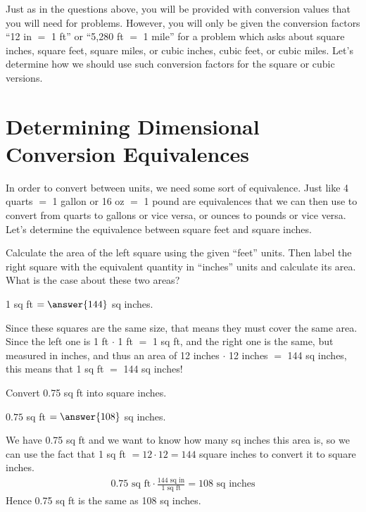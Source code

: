 \documentclass[12pt]{ximera}
\begin{document}
Just as in the questions above, you will be provided with conversion values that you
will need for problems. However, you will only be given the conversion factors ``12 in
$=$ 1 ft'' or ``5,280 ft $=$ 1 mile'' for a problem which asks about square inches,
square feet, square miles, or cubic inches, cubic feet, or cubic miles. Let's determine
how we should use such conversion factors for the square or cubic versions.

\section*{Determining Dimensional Conversion Equivalences}

In order to convert between units, we need some sort of equivalence. Just like 4 quarts
$=$ 1 gallon or 16 oz $=$ 1 pound are equivalences that we can then use to convert from
quarts to gallons or vice versa, or ounces to pounds or vice versa. Let's determine the
equivalence between square feet and square inches.


\begin{problem}
Calculate the area of the left square using the given ``feet'' units. Then label the
right square with the equivalent quantity in ``inches'' units and calculate its area.
What is the case about these two areas?

1 sq ft $= \answer{144}$ sq inches.

\begin{freeResponse}
\end{freeResponse}

\begin{solution}
Since these squares are the same size, that means they must cover the same area. Since
the left one is 1 ft $\cdot$ 1 ft $=$ 1 sq ft, and the right one is the same, but
measured in inches, and thus an area of 12 inches $\cdot$ 12 inches $=$ 144 sq inches,
this means that 1 sq ft $=$ 144 sq inches!
\end{solution}
\end{problem}

\begin{problem}
Convert 0.75 sq ft into square inches.

$0.75$ sq ft $= \answer{108}$ sq inches.

\begin{solution}
We have 0.75 sq ft and we want to know how many sq inches this area is, so we can use
the fact that 1 sq ft $= 12 \cdot 12 = 144$ square inches to convert it to square
inches.
\begin{gather*}
0.75\text{ sq ft} \cdot \frac{144\text{ sq in}}{1\text{ sq ft}} = 108\text{ sq inches}
\end{gather*}
Hence 0.75 sq ft is the same as 108 sq inches.
\end{solution}
\end{problem}
\end{document}
